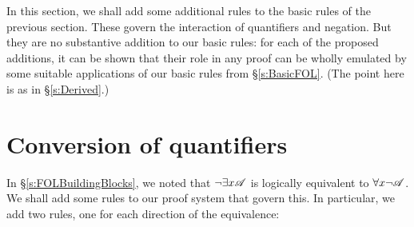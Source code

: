 In this section, we shall add some additional rules to the basic rules of the previous section. These govern the interaction of quantifiers and negation. But they are no substantive addition to our basic rules: for each of the proposed additions, it can be shown that their role in any proof can be wholly emulated by some suitable applications of our basic rules from §\ref{s:BasicFOL}. (The point here is as in §\ref{s:Derived}.)
 
\section{Conversion of quantifiers}\label{cq.rules}

In §\ref{s:FOLBuildingBlocks}, we noted that $\neg\exists x\mathscr{A}$ is logically equivalent to $\forall x \neg\mathscr{A}$. We shall add some rules to our proof system that govern this. In particular, we add two rules, one for each direction of the equivalence:

